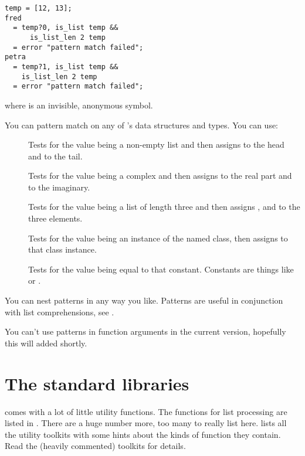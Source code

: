 \begin{verbatim}
temp = [12, 13];
fred 
  = temp?0, is_list temp && 
      is_list_len 2 temp
  = error "pattern match failed";
petra 
  = temp?1, is_list temp && 
    is_list_len 2 temp
  = error "pattern match failed";
\end{verbatim}

\noindent
where  is an invisible, anonymous symbol.

You can pattern match on any of \nip{}'s data structures and types. You can
use:

\begin{description}

\item[]
Tests for the value being a non-empty list and then assigns  to the
head and  to the tail.

\item[]
Tests for the value being a complex and then assigns  to the
real part and  to the imaginary.

\item[\ct{[a,b,c]}]
Tests for the value being a list of length three and then assigns ,
 and  to the three elements.

\item[]
Tests for the value being an instance of the named class, then assigns 
 to that class instance.

\item[]
Tests for the value being equal to that constant. Constants are things like
 or .

\end{description}

You can nest patterns in any way you like. Patterns are useful in conjunction
with list comprehensions, see .

You can't use patterns in function arguments in the current version, hopefully
this will added shortly.

\section{The standard libraries}

\nip{} comes with a lot of little utility functions. The functions for list
processing are listed in . There are a huge number more, too
many to really list here.  lists all the utility toolkits
with some hints about the kinds of function they contain. Read the (heavily
commented) toolkits for details.

